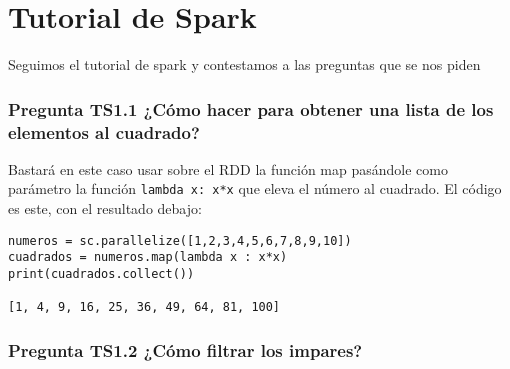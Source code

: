 \documentclass[11pt]{article}
\def\inline{\lstinline[basicstyle=\ttfamily,keywordstyle={}]}
\begin{document}
\newpage

\section{ Tutorial de Spark}

Seguimos el tutorial de spark y contestamos a las preguntas que se nos piden


\subsubsection*{ Pregunta TS1.1 ¿Cómo hacer para obtener una lista de los elementos al cuadrado?}

Bastará en este caso usar sobre el RDD la función map pasándole como parámetro la función  \inline{lambda x: x*x} que eleva el número al cuadrado. El código es este, con el resultado debajo:

\begin{verbatim}
numeros = sc.parallelize([1,2,3,4,5,6,7,8,9,10])
cuadrados = numeros.map(lambda x : x*x)
print(cuadrados.collect())

[1, 4, 9, 16, 25, 36, 49, 64, 81, 100]
\end{verbatim}
\subsubsection*{ Pregunta TS1.2 ¿Cómo filtrar los impares? }
\end{document}
